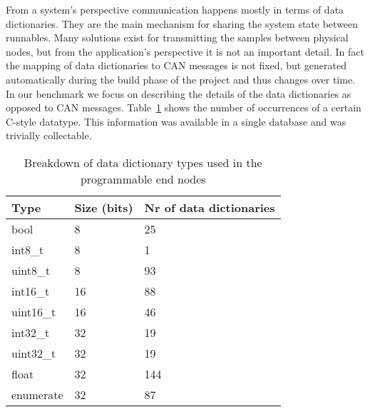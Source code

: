 From a system's perspective communication happens mostly in terms of data dictionaries. They are the main mechanism for sharing the system state between runnables. Many solutions exist for transmitting the samples between physical nodes, but from the application's perspective it is not an important detail. In fact the mapping of data dictionaries to CAN messages is not fixed, but generated automatically during the build phase of the project and thus changes over time. In our benchmark we focus on describing the details of the data dictionaries as opposed to CAN messages. Table~\ref{tab:prog_nodes_types} shows the number of occurrences of a certain C-style datatype. This information was available in a single database and was trivially collectable.
\begin{table}[htb]
    \centering
    \begin{tabular}{@{}lll@{}}
    \toprule
    Type      & Size (bits) & Nr of data dictionaries \\ \midrule
    bool      & 8           & 25                     \\
    int8\_t   & 8           & 1                      \\
    uint8\_t  & 8           & 93                     \\
    int16\_t  & 16          & 88                     \\
    uint16\_t & 16          & 46                     \\
    int32\_t  & 32          & 19                     \\
    uint32\_t & 32          & 19                     \\
    float     & 32          & 144                    \\
    enumerate & 32          & 87                     \\ \bottomrule
    \end{tabular}
    \caption{Breakdown of data dictionary types used in the programmable end nodes}
    \label{tab:prog_nodes_types}
\end{table}

